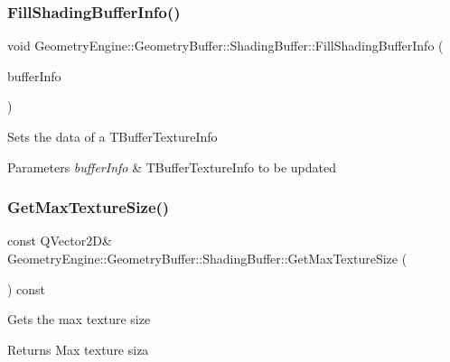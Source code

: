\subsubsection{\texorpdfstring{FillShadingBufferInfo()}{FillShadingBufferInfo()}}
{\footnotesize\ttfamily void Geometry\+Engine\+::\+Geometry\+Buffer\+::\+Shading\+Buffer\+::\+Fill\+Shading\+Buffer\+Info (\begin{DoxyParamCaption}\item[{\mbox{\hyperlink{class_geometry_engine_1_1_shading_buffer_texture_info}{Shading\+Buffer\+Texture\+Info}} \&}]{buffer\+Info }\end{DoxyParamCaption})}

Sets the data of a T\+Buffer\+Texture\+Info 
\begin{DoxyParams}{Parameters}
{\em buffer\+Info} & T\+Buffer\+Texture\+Info to be updated \\
\hline
\end{DoxyParams}
\mbox{\label{class_geometry_engine_1_1_geometry_buffer_1_1_shading_buffer_a6b45a6a2cc97775c11b6c6ff72bbc2b6}} 
\subsubsection{\texorpdfstring{GetMaxTextureSize()}{GetMaxTextureSize()}}
{\footnotesize\ttfamily const Q\+Vector2D\& Geometry\+Engine\+::\+Geometry\+Buffer\+::\+Shading\+Buffer\+::\+Get\+Max\+Texture\+Size (\begin{DoxyParamCaption}{ }\end{DoxyParamCaption}) const\hspace{0.3cm}{\ttfamily [inline]}}

Gets the max texture size \begin{DoxyReturn}{Returns}
Max texture siza 
\end{DoxyReturn}
\mbox{\label{class_geometry_engine_1_1_geometry_buffer_1_1_shading_buffer_aae6f448abdadd4ef47b7b19984fc3831}} 
